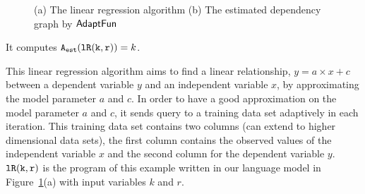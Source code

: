 \begin{example}
\begin{figure}
\begin{subfigure}{.55\textwidth}
\begin{centering}
         \caption{}
            \end{centering}
            \end{subfigure}
    \vspace{-0.5cm}
    \caption{(a) The linear regression algorithm 
    (b) The estimated dependency graph by $\textsf{AdaptFun}$}
    \vspace{-0.5cm}
    \label{fig:linear_regression}
\end{figure}
%
It computes $ {\mathtt{A_{est}}}(\mathtt{lR(k, r)}) = k$.
\end{example} 
%
This linear regression algorithm 
aims to
find a linear relationship, $y = a \times x + c$ between a dependent variable $y$
and an independent variable $x$, by approximating the 
model parameter $a$ and $c$.
In order to have a good approximation on the model parameter 
$a$ and $c$, 
it sends query to a training data set adaptively in each iteration.
This training data set contains two columns (can extend to higher dimensional data sets), 
the first column contains the observed values of the independent variable $x$ and the
second column for the dependent variable $y$.
$\mathtt{lR(k, r)}$ is the program of this example written in our language model in Figure~\ref{fig:linear_regression}(a)
with input variables $k$ and $r$.


